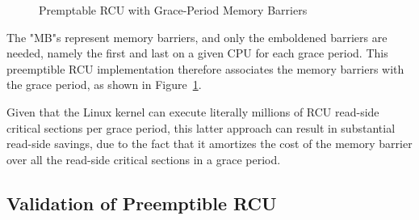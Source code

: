 \begin{figure}[htb]
\begin{center}
\end{center}
\caption{Premptable RCU with Grace-Period Memory Barriers}
\label{app:rcuimpl:Premptable RCU with Grace-Period Memory Barriers}
\end{figure}

The "MB"s represent memory barriers, and only the emboldened
barriers are needed, namely the first and last on a given CPU
for each grace period.
This preemptible RCU implementation therefore associates the memory
barriers with the grace period, as shown in
Figure~\ref{app:rcuimpl:Premptable RCU with Grace-Period Memory Barriers}.

Given that the Linux kernel can execute literally millions of RCU
read-side critical sections per grace period, this latter approach
can result in substantial read-side savings, due to the fact that it
amortizes the cost of the memory barrier over all the read-side critical
sections in a grace period.

\subsection{Validation of Preemptible RCU}
\label{app:rcuimpl:Validation of Preemptible RCU}

